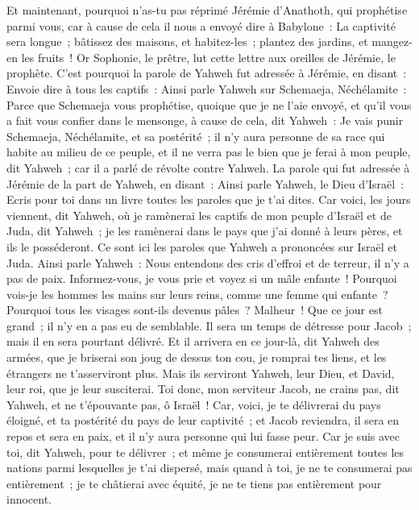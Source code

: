 \begin{multicols}{2}
Et maintenant, pourquoi n'as-tu pas réprimé Jérémie d'Anathoth, qui prophétise parmi vous,
car à cause de cela il nous a envoyé dire à Babylone~: La captivité sera longue~; bâtissez des maisons, et habitez-les~; plantez des jardins, et mangez-en les fruits~!
Or Sophonie, le prêtre, lut cette lettre aux oreilles de Jérémie, le prophète.
C'est pourquoi la parole de Yahweh fut adressée à Jérémie, en disant~:
Envoie dire à tous les captifs~: Ainsi parle Yahweh sur Schemaeja, Néchélamite~: Parce que Schemaeja vous prophétise, quoique que je ne l'aie envoyé, et qu'il vous a fait vous confier dans le mensonge,
à cause de cela, dit Yahweh~: Je vais punir Schemaeja, Néchélamite, et sa postérité~; il n'y aura personne de sa race qui habite au milieu de ce peuple, et il ne verra pas le bien que je ferai à mon peuple, dit Yahweh~; car il a parlé de révolte contre Yahweh.
\VerseOne{}La parole qui fut adressée à Jérémie de la part de Yahweh, en disant~:
Ainsi parle Yahweh, le Dieu d'Israël~: Ecris pour toi dans un livre toutes les paroles que je t'ai dites.
Car voici, les jours viennent, dit Yahweh, où je ramènerai les captifs de mon peuple d'Israël et de Juda, dit Yahweh~; je les ramènerai dans le pays que j'ai donné à leurs pères, et ils le posséderont.
Ce sont ici les paroles que Yahweh a prononcées sur Israël et Juda.
Ainsi parle Yahweh~: Nous entendons des cris d'effroi et de terreur, il n'y a pas de paix.
Informez-vous, je vous prie et voyez si un mâle enfante~! Pourquoi vois-je les hommes les mains sur leurs reins, comme une femme qui enfante~? Pourquoi tous les visages sont-ils devenus pâles~?
Malheur~! Que ce jour est grand~; il n'y en a pas eu de semblable. Il sera un temps de détresse pour Jacob~; mais il en sera pourtant délivré.
Et il arrivera en ce jour-là, dit Yahweh des armées, que je briserai son joug de dessus ton cou, je romprai tes liens, et les étrangers ne t'asserviront plus.
Mais ils serviront Yahweh, leur Dieu, et David, leur roi, que je leur susciterai.
Toi donc, mon serviteur Jacob, ne crains pas, dit Yahweh, et ne t'épouvante pas, ô Israël~! Car, voici, je te délivrerai du pays éloigné, et ta postérité du pays de leur captivité~; et Jacob reviendra, il sera en repos et sera en paix, et il n'y aura personne qui lui fasse peur.
Car je suis avec toi, dit Yahweh, pour te délivrer~; et même je consumerai entièrement toutes les nations parmi lesquelles je t'ai dispersé, mais quand à toi, je ne te consumerai pas entièrement~; je te châtierai avec équité, je ne te tiens pas entièrement pour innocent.

\end{multicols}
